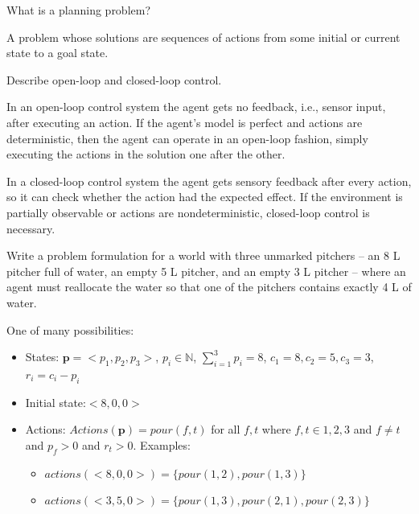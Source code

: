 \begin{questions}

\setcounter{section}{0} %

\question What is a planning problem?

\begin{solution}[1in]
A problem whose solutions are sequences of actions from some initial or current state to a goal state.
\end{solution}

\question Describe open-loop and closed-loop control.

\begin{solution}[1.5in]
In an open-loop control system the agent gets no feedback, i.e., sensor input, after executing an action.  If the agent's model is perfect and actions are deterministic, then the agent can operate in an open-loop fashion, simply executing the actions in the solution one after the other.

In a closed-loop control system the agent gets sensory feedback after every action, so it can check whether the action had the expected effect.  If the environment is partially observable or actions are nondeterministic, closed-loop control is necessary.

\end{solution}

\question Write a problem formulation for a world with three unmarked pitchers -- an 8 L pitcher full of water, an empty 5 L pitcher, and an empty 3 L pitcher -- where an agent must reallocate the water so that one of the pitchers contains exactly 4 L of water.

\begin{solution}[1in]
One of many possibilities:
\begin{itemize}
\item States: $\bm{p} = <p_1, p_2, p_3>$, $p_i \in \mathbb{N}$,  $\sum_{i = 1}^3 p_i = 8$,  $c_1 = 8, c_2 = 5, c_3 = 3$, $r_i = c_i - p_i$
\item Initial state:$<8, 0, 0>$
\item Actions: $Actions(\bm{p}) = pour(f, t)$ for all $f, t$ where $f, t \in {1,2,3}$ and $f \ne t$ and $p_f > 0$ and $r_t > 0$.  Examples:

\begin{itemize}
\item $actions(<8, 0, 0>) = \{pour(1, 2), pour(1, 3)\}$
\item $actions(<3, 5, 0>) = \{pour(1, 3), pour(2, 1), pour(2, 3)\}$
\end{itemize}


\end{itemize}
\end{solution}
\end{questions}
